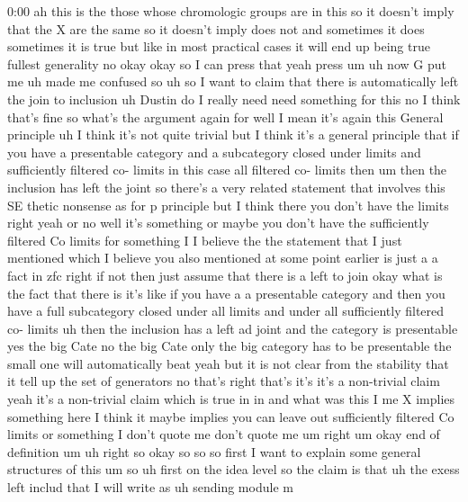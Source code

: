 \begin{unfinished}{0:00}
ah  this  is  the  those  whose  chromologic
groups  are  in  this  so  it  doesn't  imply
that  the  X  are  the  same  so  it  doesn't
imply  does  not  and  sometimes  it  does
sometimes  it  is  true
but  like  in  most  practical  cases  it  will
end  up  being
true  fullest  generality  no  okay  okay  so
I  can  press  that  yeah
press
um  uh  now  G  put  me
uh  made  me  confused  so  uh  so  I  want  to
claim  that  there  is  automatically  left
the  join  to
inclusion  uh  Dustin  do  I  really
need  need  something  for
this  no  I  think  that's  fine  so  what's
the  argument  again  for  well  I  mean  it's
again  this  General  principle
uh  I  think  it's  not  quite  trivial  but  I
think  it's  a  general  principle  that  if
you  have  a  presentable  category  and  a
subcategory  closed  under  limits  and
sufficiently  filtered  co-  limits  in  this
case  all  filtered  co-  limits  then  um
then  the  inclusion  has  left  the
joint  so  there's  a  very  related
statement  that  involves  this  SE  thetic
nonsense  as  for  p  principle  but  I  think
there  you  don't  have  the  limits  right
yeah  or  no  well  it's  something  or  maybe
you  don't  have  the  sufficiently  filtered
Co  limits  for  something  I  I  believe  the
the  statement  that  I  just  mentioned
which  I  believe  you  also  mentioned  at
some  point  earlier  is  just  a  a  fact  in
zfc
right  if  not  then  just  assume  that  there
is  a  left  to  join  okay  what  is  the  fact
that  there  is  it's  like  if  you  have  a  a
presentable  category  and  then  you  have  a
full  subcategory  closed  under  all  limits
and  under  all  sufficiently  filtered  co-
limits  uh  then  the  inclusion  has  a  left
ad  joint  and  the  category  is  presentable
yes  the  big  Cate  no  the  big  Cate  only
the  big  category  has  to  be  presentable
the  small  one  will  automatically  beat
yeah  but  it  is  not  clear  from  the
stability  that  it  tell  up  the  set  of
generators  no  that's  right  that's  it's
it's  a  non-trivial  claim  yeah  it's  a
non-trivial  claim  which  is  true  in  in
and  what  was  this  I  me  X  implies
something  here  I  think  it  maybe  implies
you  can  leave  out  sufficiently  filtered
Co  limits  or  something  I  don't  quote  me
don't  quote
me
um  right  um  okay  end  of
definition
um  uh
right  so  okay  so  so  so  first  I  want  to
explain  some  general  structures  of  this
um  so  uh  first  on  the  idea  level  so  the
claim  is
that
uh  the  exess  left
includ
that  I  will  write  as  uh  sending  module  m

\end{unfinished}
